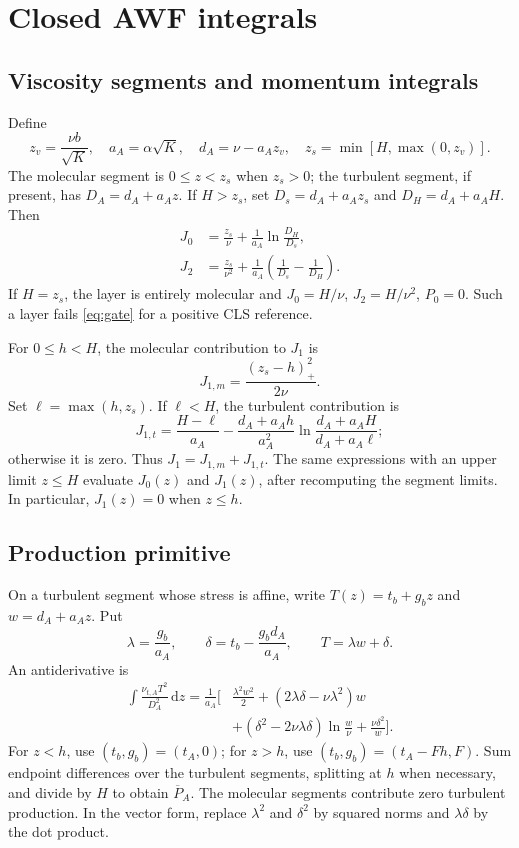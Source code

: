 \documentclass[11pt,a4paper]{article}
\numberwithin{equation}{section}
\newcommand{\dd}{\mathrm{d}}
\newcommand{\pos}[1]{\left(#1\right)_+}
\newcommand{\avg}[1]{\overline{#1}}
\begin{document}
\appendix
\section{Closed AWF integrals}
\label{app:integrals}
\subsection{Viscosity segments and momentum integrals}
Define
\begin{equation}
 z_v=\frac{\nu b}{\sqrt K},\quad
 a_A=\alpha\sqrt K,\quad d_A=\nu-a_Az_v,\quad
 z_s=\min[H,\max(0,z_v)].
\label{eq:segments}
\end{equation}
The molecular segment is $0\leq z<z_s$ when $z_s>0$; the
turbulent segment, if present, has $D_A=d_A+a_Az$.
If $H>z_s$, set $D_s=d_A+a_Az_s$ and $D_H=d_A+a_AH$.
Then
\begin{align}
 J_0&=\frac{z_s}{\nu}+\frac1{a_A}\ln\frac{D_H}{D_s},\\
 J_2&=\frac{z_s}{\nu^2}
       +\frac1{a_A}\left(\frac1{D_s}-\frac1{D_H}\right).
\label{eq:Jclosed}
\end{align}
If $H=z_s$, the layer is entirely molecular and
$J_0=H/\nu$, $J_2=H/\nu^2$, $P_0=0$. Such a layer fails
\cref{eq:gate} for a positive CLS reference.

For $0\leq h<H$, the molecular contribution to $J_1$ is
\begin{equation}
 J_{1,m}=\frac{\pos{z_s-h}^2}{2\nu}.
\end{equation}
Set $\ell=\max(h,z_s)$. If $\ell<H$, the turbulent contribution is
\begin{equation}
 J_{1,t}=\frac{H-\ell}{a_A}
 -\frac{d_A+a_Ah}{a_A^2}
       \ln\frac{d_A+a_AH}{d_A+a_A\ell};
\label{eq:J1closed}
\end{equation}
otherwise it is zero. Thus $J_1=J_{1,m}+J_{1,t}$.
The same expressions with an upper limit $z\leq H$ evaluate
$J_0(z)$ and $J_1(z)$, after recomputing the segment limits.
In particular, $J_1(z)=0$ when $z\leq h$.

\subsection{Production primitive}
On a turbulent segment whose stress is affine,
write $T(z)=t_b+g_bz$ and $w=d_A+a_Az$. Put
\begin{equation}
 \lambda=\frac{g_b}{a_A},\qquad
 \delta=t_b-\frac{g_bd_A}{a_A},\qquad T=\lambda w+\delta.
\end{equation}
An antiderivative is
\begin{align}
 \int\frac{\nu_{t,A}T^2}{D_A^2}\,\dd z
 =\frac1{a_A}\bigg[
 &\frac{\lambda^2w^2}{2}
 +(2\lambda\delta-\nu\lambda^2)w
\nonumber\\
 &+(\delta^2-2\nu\lambda\delta)\ln\frac w\nu
 +\frac{\nu\delta^2}{w}\bigg].
\label{eq:Pprimitive}
\end{align}
For $z<h$, use $(t_b,g_b)=(t_A,0)$; for $z>h$,
use $(t_b,g_b)=(t_A-Fh,F)$. Sum endpoint differences over
the turbulent segments, splitting at $h$ when necessary, and divide
by $H$ to obtain $\avg P_A$. The molecular segments contribute zero
turbulent production. In the vector form, replace $\lambda^2$ and
$\delta^2$ by squared norms and $\lambda\delta$ by the dot product.
\end{document}

